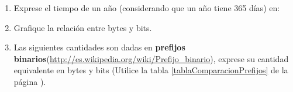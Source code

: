 \documentclass[12pt]{article}
\begin{document}
\begin{enumerate}
\begin{enumerate}
        \item Exprese el tiempo de un año (considerando que un año tiene 365
            días) en:


        \item Grafique la relación entre bytes y bits.

        \item Las siguientes cantidades son dadas en \textbf{prefijos
            binarios}(\url{http://es.wikipedia.org/wiki/Prefijo_binario}),
            exprese su cantidad equivalente en bytes y bits (Utilice la tabla
            \ref{tablaComparacionPrefijos} de la página
            \pageref{tablaComparacionPrefijos}).



\end{enumerate}
\end{enumerate}
\end{document}
